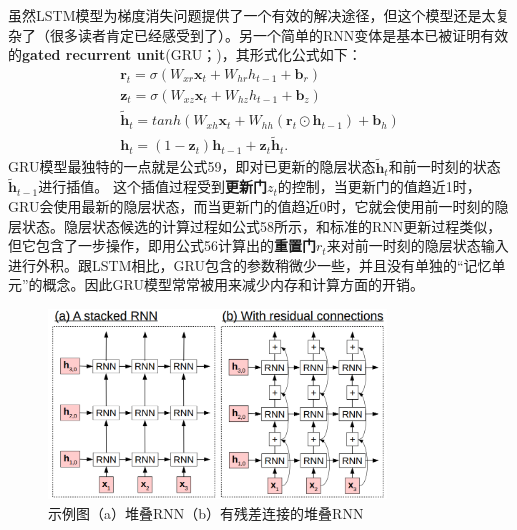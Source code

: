 \documentclass[10pt,a4paper]{ctexart}
\begin{document}
虽然LSTM模型为梯度消失问题提供了一个有效的解决途径，但这个模型还是太复杂了（很多读者肯定已经感受到了）。另一个简单的RNN变体是基本已被证明有效的\textbf{gated recurrent unit}(GRU；\cite{chung2014empirical})，其形式化公式如下：
\[
 \begin{array}{l}
 \textbf{r}_t = \sigma (W_{xr}\textbf{x}_t + W_{hr}h_{t-1} + \textbf{b}_r) \\
 \textbf{z}_t = \sigma (W_{xz}\textbf{x}_t + W_{hz}h_{t-1} + \textbf{b}_z) \\
 \tilde{\textbf{h}}_t = tanh(W_{xh}\textbf{x}_t + W_{hh}(\textbf{r}_t \odot \textbf{h}_{t-1}) + \textbf{b}_h) \\
 \textbf{h}_t = (1 - \textbf{z}_t)\textbf{h}_{t-1} + \textbf{z}_t \tilde{\textbf{h}}_t.
 \end{array}
\]
GRU模型最独特的一点就是公式59，即对已更新的隐层状态$\tilde{\textbf{h}}_t$和前一时刻的状态$\tilde{\textbf{h}}_{t-1}$进行插值。
这个插值过程受到\textbf{更新门$z_t$}的控制，当更新门的值趋近1时，GRU会使用最新的隐层状态，而当更新门的值趋近0时，它就会使用前一时刻的隐层状态。隐层状态候选的计算过程如公式58所示，和标准的RNN更新过程类似，但它包含了一步操作，即用公式56计算出的\textbf{重置门$r_t$}来对前一时刻的隐层状态输入进行外积。跟LSTM相比，GRU包含的参数稍微少一些，并且没有单独的“记忆单元”的概念。因此GRU模型常常被用来减少内存和计算方面的开销。

\begin{figure}[H]
\centering
\includegraphics[width=0.8\textwidth]{fig18.png}
\caption{示例图（a）堆叠RNN（b）有残差连接的堆叠RNN}
\label{fig:18}
\end{figure}
\end{document}
